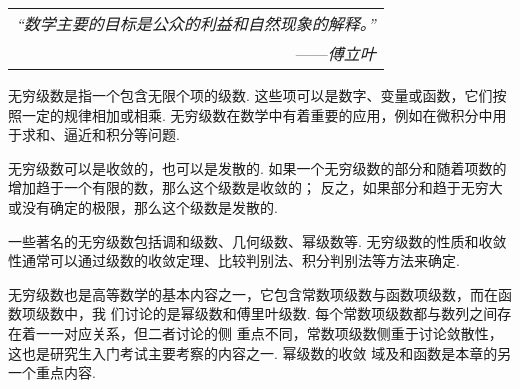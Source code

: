 \begin{flushright}
    \begin{tabular}{r|}
        \textit{“数学主要的目标是公众的利益和自然现象的解释。”}\\
        ——\textit{傅立叶}
    \end{tabular}
\end{flushright}

无穷级数是指一个包含无限个项的级数. 这些项可以是数字、变量或函数，它们按照一定的规律相加或相乘. 
无穷级数在数学中有着重要的应用，例如在微积分中用于求和、逼近和积分等问题. 

无穷级数可以是收敛的，也可以是发散的. 如果一个无穷级数的部分和随着项数的增加趋于一个有限的数，那么这个级数是收敛的；
反之，如果部分和趋于无穷大或没有确定的极限，那么这个级数是发散的. 

一些著名的无穷级数包括调和级数、几何级数、幂级数等. 无穷级数的性质和收敛性通常可以通过级数的收敛定理、比较判别法、积分判别法等方法来确定. 

无穷级数也是高等数学的基本内容之一，它包含常数项级数与函数项级数，而在函数项级数中，我
们讨论的是幂级数和傅里叶级数. 每个常数项级数都与数列之间存在着一一对应关系，但二者讨论的侧
重点不同，常数项级数侧重于讨论敛散性，这也是研究生入门考试主要考察的内容之一. 幂级数的收敛
域及和函数是本章的另一个重点内容.